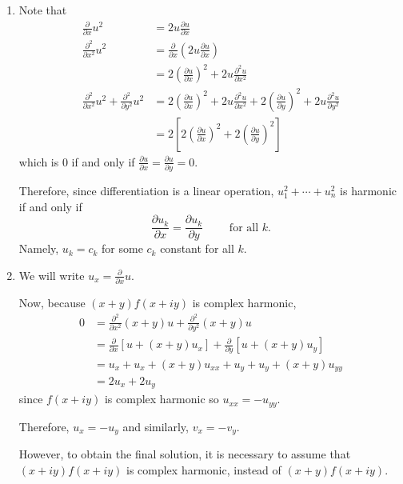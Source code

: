 \documentclass[12pt]{Qual}
\begin{document}
\begin{solution}$\,$
\begin{enumerate}[label=(\alph*)]
    \item Note that \begin{align*}
        \frac{\partial}{\partial x}u^2&=2u\frac{\partial u}{\partial x}\\
        \frac{\partial^2}{\partial x^2}u^2&=\frac{\partial}{\partial x}\left(2u\frac{\partial u}{\partial x}\right)\\
        &=2\left(\frac{\partial u}{\partial x}\right)^2+2u\frac{\partial^2 u}{\partial x^2}\\
         \frac{\partial^2}{\partial x^2}u^2+ \frac{\partial^2}{\partial y^2}u^2&=2\left(\frac{\partial u}{\partial x}\right)^2+2u\frac{\partial^2 u}{\partial x^2}+2\left(\frac{\partial u}{\partial y}\right)^2+2u\frac{\partial^2 u}{\partial y^2}\\
         &=2\left[2\left(\frac{\partial u}{\partial x}\right)^2+2\left(\frac{\partial u}{\partial y}\right)^2\right]
    \end{align*} which is $0$ if and only if $\frac{\partial u}{\partial x}=\frac{\partial u}{\partial y}=0$.

    Therefore, since differentiation is a linear operation, $u_1^2+\cdots+u_n^2$ is harmonic if and only if $$\frac{\partial u_k}{\partial x}=\frac{\partial u_k}{\partial y}\qquad\text{ for all }k.$$ Namely, $u_k=c_k$ for some $c_k$ constant for all $k.$

    \item We will write $u_x=\frac{\partial}{\partial x}u.$

     Now, because $(x+y)f(x+iy)$ is complex harmonic, \begin{align*}
        0&=\frac{\partial^2}{\partial x^2}(x+y)u+\frac{\partial^2}{\partial y^2}(x+y)u\\
        &=\frac{\partial}{\partial x}\left[u+(x+y)u_x\right]+\frac{\partial}{\partial y}\left[u+(x+y)u_y\right]\\
        &=u_x+u_x+(x+y)u_{xx}+u_y+u_y+(x+y)u_{yy}\\
        &=2u_x+2u_y
    \end{align*} since $f(x+iy)$ is complex harmonic so $u_{xx}=-u_{yy}.$

    Therefore, $u_x=-u_y$ and similarly, $v_x=-v_y$.

    However, to obtain the final solution, it is necessary to assume that $(x+iy)f(x+iy)$ is complex harmonic, instead of $(x+y)f(x+iy)$.


\end{enumerate}
\end{solution}
\end{document}
